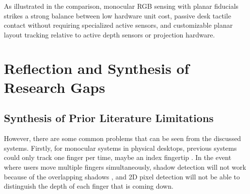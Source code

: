 \begin{table}[htbp]
\centering
\caption{System architecture design trade-offs across sensing modalities.}
\label{tab:lit_sensing_tradeoffs}
\end{table}

As illustrated in the comparison, monocular RGB sensing with planar fiducials strikes a strong balance between low hardware unit cost, passive desk tactile contact without requiring specialized active sensors, and customizable planar layout tracking relative to active depth sensors or projection hardware.

\section{Reflection and Synthesis of Research Gaps}
\label{sec:lit_reflection}

\subsection{Synthesis of Prior Literature Limitations}
\label{subsec:lit_synthesis_limitations}
However, there are some common problems that can be seen from the discussed systems. Firstly, for monocular systems in physical desktops, previous systems could only track one finger per time, maybe an index fingertip \cite{Zhang2001Visual, Srivastava2012RealTime, Posner2012Single, Thomas2013Camera, Ji2018Local, Khare2019QWERTY}. In the event where users move multiple fingers simultaneously, shadow detection will not work because of the overlapping shadows \cite{Posner2012Single, Yue2014Blind}, and 2D pixel detection will not be able to distinguish the depth of each finger that is coming down.

